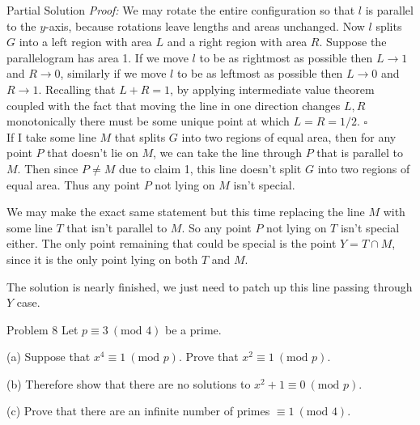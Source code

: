 \documentclass{article}
\begin{document}
\begin{solution}{Partial Solution}
\textit{Proof: } We may rotate the entire configuration so that $l$ is
parallel to the $y$-axis, because rotations leave lengths and areas
unchanged. Now $l$ splits $G$ into a left region with area $L$ and a right
region with area $R$.
Suppose the parallelogram has area 1. If we move $l$ to be as rightmost
as possible then $L \rightarrow 1$ and $R \rightarrow 0$, similarly
if we move $l$ to be as leftmost as possible then $L \rightarrow 0$ and
$R \rightarrow 1$. Recalling that $L + R = 1$, by applying
intermediate value theorem coupled with the fact that moving the line in
one direction changes $L, R$ monotonically
there must be some unique point at which $L = R = 1/2$.
$\square$ \\

If I take some line $M$ that splits $G$ into two regions
of equal area, then for any point $P$ that doesn't lie on $M$, we can take
the line through $P$ that is parallel to $M$. Then since $P \neq M$ due to
claim 1, this line doesn't split $G$ into two regions of equal area.
Thus any point $P$ not lying on $M$ isn't special.
\vspace{0.2cm}

We may make the exact same statement but this time replacing the line $M$
with some line $T$ that isn't parallel to $M$. So any point $P$ not lying
on $T$ isn't special either. The only point remaining that could be special
is the point $Y = T \cap M$, since it is the only point lying on both
$T$ and $M$. \vspace{0.2cm}

The solution is nearly finished, we just need to patch up this line
passing through $Y$ case.
\end{solution}
\newpage


\begin{problem}{Problem 8}
Let $p \equiv 3 \ (\text{mod } 4)$ be a prime.\vspace{0.2cm}

(a) Suppose that $x^4 \equiv 1 \ (\text{mod } p)$. Prove that
$x^2 \equiv 1 \ (\text{mod } p)$.\vspace{0.2cm}

(b) Therefore show that there are no solutions to
$x^2 + 1 \equiv 0 \ (\text{mod } p)$. \vspace{0.2cm}

(c) Prove that there are an infinite number of primes
$\equiv 1 \ (\text{mod } 4)$.
\end{problem}
\end{document}
